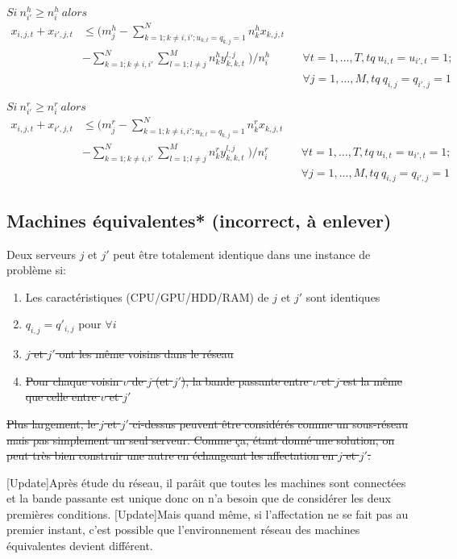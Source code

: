 \documentclass[twoside,fleqn]{EPURapport}
\begin{document}
$Si\ n^h_{i\prime}\geq n^h_{i}\ alors\;$
\begin{align}
x_{i,j,t}+x_{i\prime,j,t} &\leq (m^h_j-\sum^N_{k=1;k\neq{i},i\prime;u_{k,t}= q_{k,j}=1}{n^h_kx_{k,j,t}} \nonumber \\
 & - \sum^N_{k=1; k\neq{i},i\prime}{\sum^M_{l=1;l\neq{j}}{n^h_ky^{l,j}_{k,k,t}} }\;)/n^h_i        &&\forall t=1,\ldots,T, tq\ u_{i,t}=u_{i\prime,t}=1;  \nonumber \\
 & &&\forall j=1, \ldots, M, tq\ q_{i,j}=q_{i\prime,j}=1
\end{align}

$Si\ n^r_{i\prime}\geq n^r_{i}\ alors\;$
\begin{align}
x_{i,j,t}+x_{i\prime,j,t} &\leq (m^r_j-\sum^N_{k=1;k\neq{i},i\prime;u_{k,t}= q_{k,j}=1}{n^r_kx_{k,j,t}} \nonumber \\
 & - \sum^N_{k=1; k\neq{i},i\prime}{\sum^M_{l=1;l\neq{j}}{n^r_ky^{l,j}_{k,k,t}} }\;)/n^r_i        &&\forall t=1,\ldots,T, tq\ u_{i,t}=u_{i\prime,t}=1;  \nonumber \\
 & &&\forall j=1, \ldots, M, tq\ q_{i,j}=q_{i\prime,j}=1
\end{align}


\subsection{Machines équivalentes* (incorrect, à enlever)}
Deux serveurs $j$ et $j'$ peut être totalement identique dans une instance de problème si:
\begin{enumerate}
\item Les caractéristiques (CPU/GPU/HDD/RAM) de $j$ et $j'$ sont identiques
\item $q_{i,j} = q'_{i,j}$ pour $\forall i$
\item \sout{$j$ et $j'$ ont les même voisins dans le réseau}
\item \sout{Pour chaque voisin $v$ de $j$ (et $j'$), la bande passante entre $v$ et $j$ est la même que celle entre $v$ et $j'$}
\end{enumerate}
\bigskip
\sout{Plus largement, le $j$ et $j'$ ci-dessus peuvent être considérés comme un sous-réseau mais pas simplement un seul serveur. Comme ça, étant donné une solution, on peut très bien construir une autre en échangeant les affectation en $j$ et $j'$.}

[Update]Après étude du réseau, il parâit que toutes les machines sont connectées et la bande passante est unique donc on n'a besoin que de considérer les deux premières conditions. [Update]Mais quand même, si l'affectation ne se fait pas au premier instant, c'est possible que l'environnement réseau des machines équivalentes devient différent.
\end{document}
